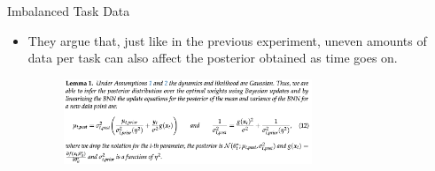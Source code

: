 \documentclass[12pt,aspectratio=169, handout]{beamer}
\let\olditem\item
\renewcommand\item{\olditem\justifying}
\begin{document}
\begin{frame}{Imbalanced Task Data}
    



    \vspace{-1em}
    \begin{itemize}[<+->]
        \item They argue that, just like in the previous experiment, uneven amounts of data per task can also affect the posterior obtained as time goes on.
        \begin{figure}
    		\centering
    		\includegraphics[width=0.7\textwidth]{"images/lemma1.png"}
    	\end{figure}
    \end{itemize}

\end{frame}
\end{document}
